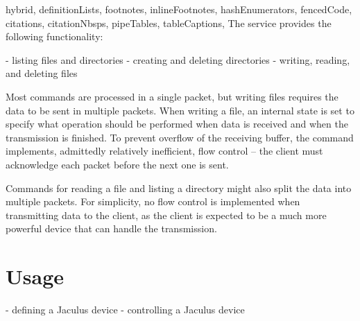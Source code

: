 \begin{markdown*}{%
  hybrid,
  definitionLists,
  footnotes,
  inlineFootnotes,
  hashEnumerators,
  fencedCode,
  citations,
  citationNbsps,
  pipeTables,
  tableCaptions,
}
The service provides the following functionality:

  - listing files and directories
  - creating and deleting directories
  - writing, reading, and deleting files

Most commands are processed in a single packet, but writing files requires the data to be sent in multiple packets. When writing a file, an internal state is set to specify what operation should be performed when data is received and when the transmission is finished. To prevent overflow of the receiving buffer, the command implements, admittedly relatively inefficient, flow control -- the client must acknowledge each packet before the next one is sent.

Commands for reading a file and listing a directory might also split the data into multiple packets. For simplicity, no flow control is implemented when transmitting data to the client, as the client is expected to be a much more powerful device that can handle the transmission.


\section{Usage}

  - defining a Jaculus device
  - controlling a Jaculus device


\end{markdown*}